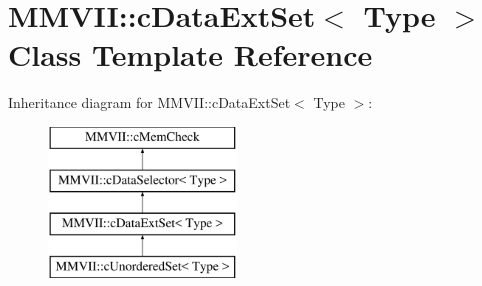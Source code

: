 \hypertarget{classMMVII_1_1cDataExtSet}{}\section{M\+M\+V\+II\+:\+:c\+Data\+Ext\+Set$<$ Type $>$ Class Template Reference}
\label{classMMVII_1_1cDataExtSet}
Inheritance diagram for M\+M\+V\+II\+:\+:c\+Data\+Ext\+Set$<$ Type $>$\+:\begin{figure}[H]
\begin{center}
\leavevmode
\includegraphics[height=4.000000cm]{classMMVII_1_1cDataExtSet}
\end{center}
\end{figure}
